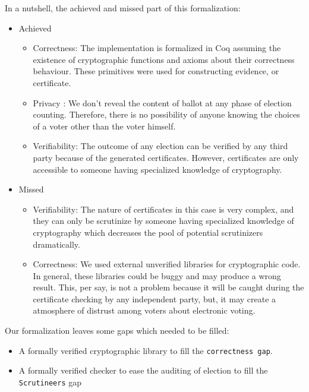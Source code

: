 In a nutshell, the achieved and missed part of this formalization:

\begin{itemize}
\item Achieved
\begin{itemize}
\item Correctness: The implementation is formalized in Coq assuming the 
         existence of cryptographic 
         functions and axioms about their correctness behaviour. These primitives were 
         used for constructing evidence, or certificate. 
         
\item Privacy : We don't reveal the content of ballot at any phase of election counting. Therefore, 
         there is no possibility of anyone knowing the choices of a voter other than the voter himself.
                 
\item Verifiability: The outcome of any election can be verified by any third party because 
          of the generated certificates. However, certificates are only accessible to someone 
          having specialized  knowledge of cryptography. 

\end{itemize}
\item Missed
\begin{itemize}
 \item Verifiability:  The nature of certificates in this case is very complex, and they can only be scrutinize 
          by someone having specialized knowledge of cryptography which decreases the pool of potential 
          scrutinizers dramatically.
              
 \item Correctness: We used external unverified libraries for cryptographic code.  In general, these libraries 
 		  could be buggy and 
          may produce a wrong result. This, per say, is not a problem because it will be caught during the 
          certificate checking by any independent party, but, it may create a atmosphere of distrust among 
          voters about electronic voting.  
 
 
\end{itemize}
\end{itemize}


Our formalization leaves some gaps which needed to be filled:
\begin{itemize}
\item A formally verified cryptographic library to fill the \texttt{correctness gap}.
\item A formally verified checker to ease the auditing of election to fill the \texttt{Scrutineers} gap
\end{itemize}


